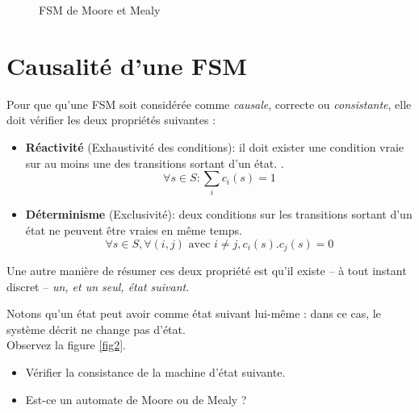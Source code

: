 \documentclass[a4paper,11pt]{article}
\begin{document}
\begin{figure}[!h]
    \centering
    \qquad
    \caption{FSM de Moore et Mealy}%
    \label{fig:example}%
\end{figure}


\section{Causalité d'une FSM}
Pour que qu'une FSM  soit considérée comme {\it causale}, correcte ou {\it consistante}, elle doit vérifier les deux propriétés suivantes :
\begin{itemize}
\item \textbf{Réactivité} (Exhaustivité des conditions): il doit exister une condition vraie sur au moins une des transitions sortant d'un état. .
$$\forall s \in S : \sum_i c_i(s)=1$$
\item \textbf{Déterminisme} (Exclusivité): deux conditions sur les transitions sortant d'un état ne peuvent être vraies en même temps.
$$\forall s \in S, \forall (i,j) \text{ avec } i \neq j, c_i(s).c_j(s)=0$$
\end{itemize}

Une autre manière de résumer ces deux propriété est qu'il existe -- à tout instant discret -- {\it un, et un seul, état suivant}.

Notons qu'un état peut avoir comme état suivant lui-même : dans ce cas, le système décrit ne change pas d'état.\\


Observez la figure \ref{fig2}.
\begin{itemize}
\item Vérifier la consistance de la machine d'état suivante.
\item Est-ce un automate de Moore ou de Mealy ?
\end{itemize}
\end{document}
